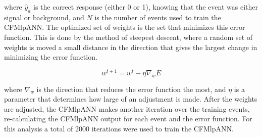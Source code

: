 \noindent where $\hat{y}_{a}$ is the correct response (either 0 or 1),
knowing that the event was either signal or background, and $N$ is the
number of events used to train the CFMlpANN.  The optimized set of
weights is the set that minimizes this error function.  This is done
by the method of steepest descent, where a random set of weights is
moved a small distance in the direction that gives the largest change
in minimizing the error function.  

\begin{equation}\label{eq:ann_reweight}
w^{t+1} = w^{t} - \eta\nabla_{w}E
\end{equation}

\noindent where $\nabla_{w}$ is the direction that reduces the error
function the most, and $\eta$ is a parameter that determines how large
of an adjustment is made.  After the weights are adjusted, the
CFMlpANN makes another iteration over the training events,
re-calculating the CFMlpANN output for each event and the error
function.  For this analysis a total of 2000 iterations were used to
train the CFMlpANN.  

